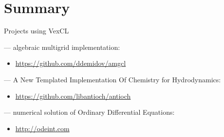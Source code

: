 \documentclass[@BEAMER_OPTIONS@]{beamer}
\begin{document}
\section{Summary}

\begin{frame}{Projects using VexCL}
    \begin{description}[\quad]
        \item[AMGCL] --- algebraic multigrid implementation:
            \begin{itemize}
                \item \href{https://github.com/ddemidov/amgcl}{https://github.com/ddemidov/amgcl}
            \end{itemize}
            \vspace{\baselineskip}
        \item[Antioch] --- A New Templated Implementation Of Chemistry for
            Hydrodynamics:
            \begin{itemize}
                \item \href{https://github.com/libantioch/antioch}{https://github.com/libantioch/antioch}
            \end{itemize}
            \vspace{\baselineskip}
        \item[Boost.odeint] --- numerical solution of Ordinary Differential
            Equations:
            \begin{itemize}
                \item \href{http://odeint.com}{http://odeint.com}
            \end{itemize}
    \end{description}
\end{frame}

\note{ }
\end{document}

